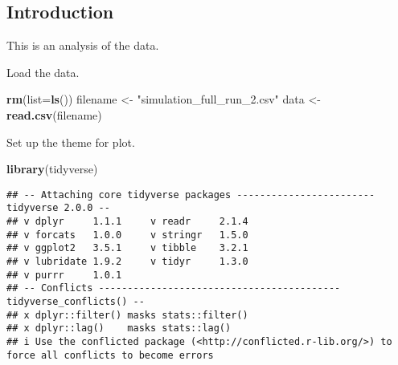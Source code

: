 \documentclass[
]{article}
\newenvironment{Shaded}{\begin{snugshade}}{\end{snugshade}}
\newcommand{\AttributeTok}[1]{\textcolor[rgb]{0.13,0.29,0.53}{#1}}
\newcommand{\DecValTok}[1]{\textcolor[rgb]{0.00,0.00,0.81}{#1}}
\newcommand{\FunctionTok}[1]{\textcolor[rgb]{0.13,0.29,0.53}{\textbf{#1}}}
\newcommand{\NormalTok}[1]{#1}
\newcommand{\OtherTok}[1]{\textcolor[rgb]{0.56,0.35,0.01}{#1}}
\newcommand{\SpecialCharTok}[1]{\textcolor[rgb]{0.81,0.36,0.00}{\textbf{#1}}}
\newcommand{\StringTok}[1]{\textcolor[rgb]{0.31,0.60,0.02}{#1}}
\begin{document}
\hypertarget{introduction}{%
\subsection{Introduction}\label{introduction}}

This is an analysis of the data.

Load the data.

\begin{Shaded}
\begin{Highlighting}[]
\FunctionTok{rm}\NormalTok{(}\AttributeTok{list=}\FunctionTok{ls}\NormalTok{())}
\NormalTok{filename }\OtherTok{\textless{}{-}} \StringTok{"simulation\_full\_run\_2.csv"}
\NormalTok{data }\OtherTok{\textless{}{-}} \FunctionTok{read.csv}\NormalTok{(filename)}
\end{Highlighting}
\end{Shaded}

\begin{Shaded}
\end{Shaded}

Set up the theme for plot.

\begin{Shaded}
\begin{Highlighting}[]
\FunctionTok{library}\NormalTok{(tidyverse)}
\end{Highlighting}
\end{Shaded}

\begin{verbatim}
## -- Attaching core tidyverse packages ------------------------ tidyverse 2.0.0 --
## v dplyr     1.1.1     v readr     2.1.4
## v forcats   1.0.0     v stringr   1.5.0
## v ggplot2   3.5.1     v tibble    3.2.1
## v lubridate 1.9.2     v tidyr     1.3.0
## v purrr     1.0.1     
## -- Conflicts ------------------------------------------ tidyverse_conflicts() --
## x dplyr::filter() masks stats::filter()
## x dplyr::lag()    masks stats::lag()
## i Use the conflicted package (<http://conflicted.r-lib.org/>) to force all conflicts to become errors
\end{verbatim}
\end{document}
